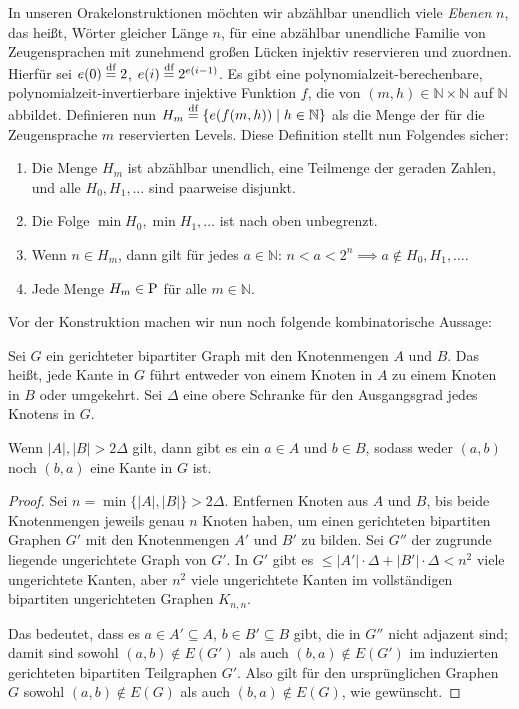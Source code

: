 In unseren Orakelonstruktionen möchten wir abzählbar unendlich viele \emph{Ebenen} $n$, das heißt, Wörter gleicher Länge $n$, für eine abzählbar unendliche Familie von Zeugensprachen mit zunehmend großen Lücken injektiv reservieren und zuordnen.
Hierfür sei $e(0) \defeq 2$, $e(i) \defeq 2^{e(i-1)}$.
Es gibt eine polynomialzeit-berechenbare, polynomialzeit-invertierbare injektive Funktion $f$, die von $(m,h)\in\mathbb N\times\mathbb N$ auf $\mathbb N$ abbildet.
Definieren nun $H_m \defeq \{ e(f(m,h)) \mid h\in\mathbb N \}$ als die Menge der für die Zeugensprache $m$ reservierten Levels.
Diese Definition stellt nun Folgendes sicher:
\begin{observation}\label{obs:leveldefinitions}
    \begin{enumerate}
        \item Die Menge $H_m$ ist abzählbar unendlich, eine Teilmenge der geraden Zahlen, und alle $H_0, H_1, \dots$ sind paarweise disjunkt.
        \item Die Folge $\min H_0, \min H_1, \dots$ ist nach oben unbegrenzt.
        \item Wenn $n\in H_m$, dann gilt für jedes $a\in\mathbb N$: $n<a<2^{n} \implies a\not\in H_0, H_1, \dots$.
        \item Jede Menge $H_m\in \P$ für alle $m\in\mathbb N$.
    \end{enumerate}
\end{observation}
Vor der Konstruktion machen wir nun noch folgende kombinatorische Aussage:
\begin{lemma}\label{lemma:bipartite}
    Sei $G$ ein gerichteter bipartiter Graph mit den Knotenmengen $A$ und $B$.
    Das heißt, jede Kante in $G$ führt entweder von einem Knoten in $A$ zu einem Knoten in $B$ oder umgekehrt.
    Sei $\Delta$ eine obere Schranke für den Ausgangsgrad jedes Knotens in $G$.

    Wenn $|A|,|B|>2\Delta$ gilt, dann gibt es ein $a\in A$ und $b\in B$, sodass weder $(a,b)$ noch $(b,a)$ eine Kante in $G$ ist.
\end{lemma}
\begin{proof}
    Sei $n=\min\{|A|,|B|\}>2\Delta$.
    Entfernen Knoten aus $A$ und $B$, bis beide Knotenmengen jeweils genau $n$ Knoten haben, um einen gerichteten bipartiten Graphen $G'$ mit den Knotenmengen $A'$ und $B'$ zu bilden.
    Sei $G''$ der zugrunde liegende ungerichtete Graph von $G'$.
    In $G'$ gibt es $\leq |A'|\cdot \Delta + |B'|\cdot\Delta<n^2$ viele ungerichtete Kanten,
    aber $n^2$ viele ungerichtete Kanten im vollständigen bipartiten ungerichteten Graphen $K_{n,n}$.

    Das bedeutet, dass es $a\in A'\subseteq A$, $b\in B'\subseteq B$ gibt, die in $G''$ nicht adjazent sind; damit sind sowohl $(a,b)\not\in E(G')$ als auch $(b,a)\not\in E(G')$ im induzierten gerichteten bipartiten Teilgraphen $G'$.
    Also gilt für den ursprünglichen Graphen $G$ sowohl $(a,b)\not\in E(G)$ als auch $(b,a)\not\in E(G)$, wie gewünscht.
\end{proof}
